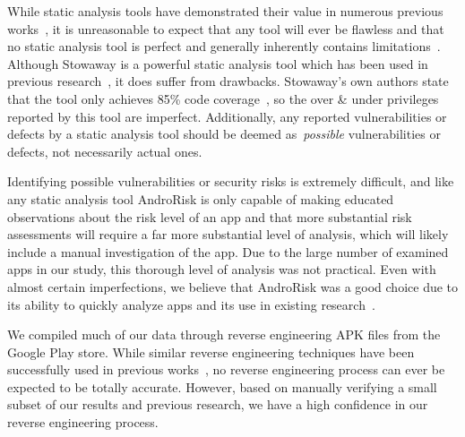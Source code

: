 \documentclass{sig-alternate}
\begin{document}
While static analysis tools have demonstrated their value in numerous previous works~\cite{Felt:2011:APD:2046707.2046779, Pearce:2012:APS:2414456.2414498}, it is unreasonable to expect that any tool will ever be flawless and that no static analysis tool is perfect and generally inherently contains limitations~\cite{chess2004static}. Although Stowaway is a powerful static analysis tool which has been used in previous research~\cite{Pearce:2012:APS:2414456.2414498,Stevens_investigatinguser,jeon2011dr}, it does suffer from drawbacks. Stowaway's own authors state that the tool only achieves 85\% code coverage~\cite{Felt:2011:APD:2046707.2046779}, so the over \& under privileges reported by this tool are imperfect. Additionally, any reported vulnerabilities or defects by a static analysis tool should be deemed as~\emph{possible} vulnerabilities or defects, not necessarily actual ones.

Identifying possible vulnerabilities or security risks is extremely difficult, and like any static analysis tool AndroRisk is only capable of making educated observations about the risk level of an app and that more substantial risk assessments will require a far more substantial level of analysis, which will likely include a manual investigation of the app. Due to the large number of examined apps in our study, this thorough level of analysis was not practical. Even with almost certain imperfections, we believe that AndroRisk was a good choice due to its ability to quickly analyze apps and its use in existing research~\cite{krutz2015FDroid}.

We compiled much of our data through reverse engineering APK files from the Google Play store. While similar reverse engineering techniques have been successfully used in previous works~\cite{Lee_2013,6687155}, no reverse engineering process can ever be expected to be totally accurate. However, based on manually verifying a small subset of our results and previous research, we have a high confidence in our reverse engineering process.


\end{document}
